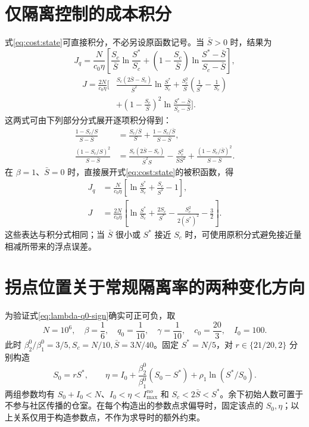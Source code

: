 \documentclass[lang=cn,a4paper,newtx]{elegantpaper}
\numberwithin{equation}{section}
\theoremstyle{plain}
\begin{document}
\section{仅隔离控制的成本积分}
\label{app:cost}
式\eqref{eq:cost:state}可直接积分，不必另设原函数记号。当 $\bar S>0$ 时，结果为
\begin{equation}
J_q=\frac{N}{c_0\eta}\left[
\frac{S_c}{\bar S}\ln\frac{S^*}{S_c}
+\left(1-\frac{S_c}{\bar S}\right)\ln\frac{S^*-\bar S}{S_c-\bar S}\right],
\label{eq:cost:closed-linear}
\end{equation}
\begin{equation}
\begin{split}
J=\frac{2N}{c_0\eta}\bigg[&
\frac{S_c(2\bar S-S_c)}{\bar S^2}\ln\frac{S^*}{S_c}
+\frac{S_c^2}{\bar S}\left(\frac1{S^*}-\frac1{S_c}\right)\\
&+\left(1-\frac{S_c}{\bar S}\right)^2
\ln\frac{S^*-\bar S}{S_c-\bar S}\bigg].
\end{split}
\label{eq:cost:closed}
\end{equation}
这两式可由下列部分分式展开逐项积分得到：
\begin{align*}
\frac{1-S_c/S}{S-\bar S}
&=\frac{S_c/\bar S}{S}
 +\frac{1-S_c/\bar S}{S-\bar S},\\
\frac{(1-S_c/S)^2}{S-\bar S}
&=\frac{S_c(2\bar S-S_c)}{\bar S^2S}
-\frac{S_c^2}{\bar S S^2}
+\frac{(1-S_c/\bar S)^2}{S-\bar S}.
\end{align*}
在 $\beta=1$、$\bar S=0$ 时，直接展开式\eqref{eq:cost:state}的被积函数，得
\begin{align}
J_q&=\frac{N}{c_0\eta}\left[\ln\frac{S^*}{S_c}+\frac{S_c}{S^*}-1\right],\\
J&=\frac{2N}{c_0\eta}\left[\ln\frac{S^*}{S_c}+\frac{2S_c}{S^*}
-\frac{S_c^2}{2(S^*)^2}-\frac32\right].
\end{align}
这些表达与积分式相同；当 $\bar S$ 很小或 $S^*$ 接近 $S_c$ 时，可使用原积分式避免接近量相减所带来的浮点误差。

\section{拐点位置关于常规隔离率的两种变化方向}
\label{app:lambda}
为验证式\eqref{eq:lambda-q0-sign}确实可正可负，取
\[
N=10^6,\quad \beta=\frac16,\quad q_0=\frac1{10},\quad
\gamma=\frac1{10},\quad c_0=\frac{20}{3},\quad I_0=100.
\]
此时 $\beta_2^0/\beta_1^0=3/5,S_c=N/10,\bar S=3N/40$。固定 $S^*=N/5$，对 $r\in\{21/20,2\}$ 分别构造
\[
S_0=rS^*,\qquad
\eta=I_0+\frac{\beta_2^0}{\beta_1^0}(S_0-S^*)+\rho_1\ln(S^*/S_0).
\]
两组参数均有 $S_0+I_0<N$、$I_0<\eta<I_{\max}^{no}$ 和 $S_c<2\bar S<S^*$。余下初始人数可置于不参与社区传播的仓室。在每个构造出的参数点求偏导时，固定该点的 $S_0,\eta$；以上关系仅用于构造参数点，不作为求导时的额外约束。
\end{document}
